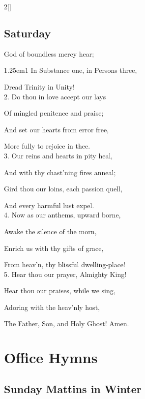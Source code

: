 \begin{paracol}{2}[]
\subsection{Saturday}\label{SaturdayInvitatory}

 God of boundless mercy hear;


\begin{hangparas}{1.25em}{1}
In Substance one, in Persons three,

Dread Trinity in Unity!\\

2. Do thou in love accept our lays

Of mingled penitence and praise;

And set our hearts from error free,

More fully to rejoice in thee.\\

3. Our reins and hearts in pity heal,

And with thy chast'ning fires anneal;

Gird thou our loins, each passion quell,

And every harmful lust expel.\\

4. Now as our anthems, upward borne,

Awake the silence of the morn,

Enrich us with thy gifts of grace,

From heav'n, thy blissful dwelling-place!\\

5. Hear thou our prayer, Almighty King!

Hear thou our praises, while we sing,

Adoring with the heav'nly host,

The Father, Son, and Holy Ghost! Amen.
\end{hangparas}


\fussy
\end{paracol}

\clearpage

\section{Office Hymns}

\subsection{Sunday Mattins in Winter}\label{SundayMattinsWinter}

